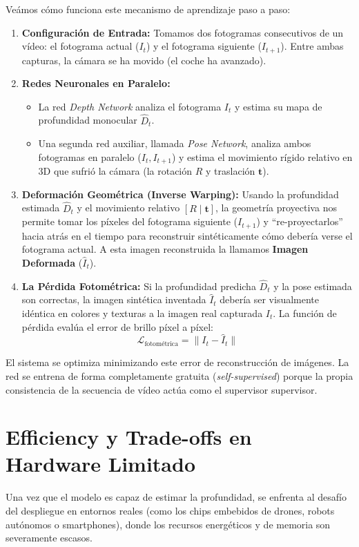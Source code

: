 \noindent
Veámos cómo funciona este mecanismo de aprendizaje paso a paso:
\begin{enumerate}
    \item \textbf{Configuración de Entrada:} Tomamos dos fotogramas consecutivos de un vídeo: el fotograma actual ($I_t$) y el fotograma siguiente ($I_{t+1}$). Entre ambas capturas, la cámara se ha movido (el coche ha avanzado).
    \item \textbf{Redes Neuronales en Paralelo:} 
    \begin{itemize}
        \item La red \textit{Depth Network} analiza el fotograma $I_t$ y estima su mapa de profundidad monocular $\hat{D}_t$.
        \item Una segunda red auxiliar, llamada \textit{Pose Network}, analiza ambos fotogramas en paralelo ($I_t, I_{t+1}$) y estima el movimiento rígido relativo en $3\text{D}$ que sufrió la cámara (la rotación $R$ y traslación $\mathbf{t}$).
    \end{itemize}
    \item \textbf{Deformación Geométrica (Inverse Warping):} Usando la profundidad estimada $\hat{D}_t$ y el movimiento relativo $[R \mid \mathbf{t}]$, la geometría proyectiva nos permite tomar los píxeles del fotograma siguiente ($I_{t+1}$) y ``re-proyectarlos'' hacia atrás en el tiempo para reconstruir sintéticamente cómo debería verse el fotograma actual. A esta imagen reconstruida la llamamos \textbf{Imagen Deformada} ($\hat{I}_t$).
    \item \textbf{La Pérdida Fotométrica:} Si la profundidad predicha $\hat{D}_t$ y la pose estimada son correctas, la imagen sintética inventada $\hat{I}_t$ debería ser visualmente idéntica en colores y texturas a la imagen real capturada $I_t$. La función de pérdida evalúa el error de brillo píxel a píxel:
    \begin{equation}
        \mathcal{L}_{\text{fotométrica}} = \|I_t - \hat{I}_t\|
    \end{equation}
\end{enumerate}
El sistema se optimiza minimizando este error de reconstrucción de imágenes. La red se entrena de forma completamente gratuita (\textit{self-supervised}) porque la propia consistencia de la secuencia de vídeo actúa como el supervisor supervisor.

\section{Efficiency y Trade-offs en Hardware Limitado}
Una vez que el modelo es capaz de estimar la profundidad, se enfrenta al desafío del despliegue en entornos reales (como los chips embebidos de drones, robots autónomos o smartphones), donde los recursos energéticos y de memoria son severamente escasos. \\

